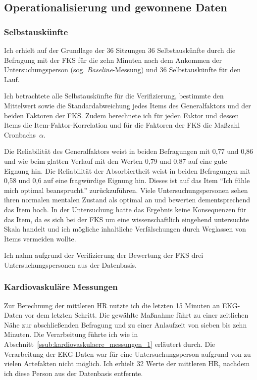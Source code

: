 \subsection{Operationalisierung und gewonnene Daten}

\subsubsection{Selbstauskünfte}
Ich erhielt auf der Grundlage der 36 Sitzungen 36 Selbstauskünfte durch die Befragung mit der \ac{FKS} für die zehn Minuten nach dem Ankommen der Untersuchungsperson (sog. \emph{Baseline}-Messung) und 36 Selbstauskünfte für den Lauf. 

Ich betrachtete alle Selbstauskünfte für die Verifizierung, bestimmte den Mittelwert sowie die Standardabweichung jedes Items des Generalfaktors und der beiden Faktoren der \ac{FKS}. Zudem berechnete ich für jeden Faktor und dessen Items die Item-Faktor-Korrelation und für die Faktoren der \ac{FKS} die Maßzahl Cronbachs~$\alpha$. 

Die Reliabilität des Generalfaktors weist in beiden Befragungen mit 0,77 und 0,86 und wie beim glatten Verlauf mit den Werten 0,79 und 0,87 auf eine gute Eignung hin. Die Reliabilität der Absorbiertheit weist in beiden Befragungen mit 0,58 und 0,6 auf eine fragwürdige Eignung hin. Dieses ist auf das Item "`Ich fühle mich optimal beansprucht."' zurückzuführen. Viele Untersuchungspersonen sehen ihren normalen mentalen Zustand als optimal an und bewerten dementsprechend das Item hoch. In der Untersuchung hatte das Ergebnis keine Konsequenzen für das Item, da es sich bei der \ac{FKS} um eine wissenschaftlich eingehend untersuchte Skala handelt und ich mögliche inhaltliche Verfälschungen durch Weglassen von Items vermeiden wollte. 

Ich nahm aufgrund der Verifizierung der Bewertung der \ac{FKS} drei Untersuchungspersonen aus der Datenbasis. 

\subsubsection{Kardiovaskuläre Messungen}
Zur Berechnung der mittleren \ac{HR} nutzte ich die letzten 15 Minuten an \ac{EKG}-Daten vor dem letzten Schritt. Die gewählte Maßnahme führt zu einer zeitlichen Nähe zur abschließenden Befragung und zu einer Anlaufzeit von sieben bis zehn Minuten. Die Verarbeitung führte ich wie in Abschnitt~\ref{ssub:kardiovaskulaere_messungen_1} erläutert durch. Die Verarbeitung der \ac{EKG}-Daten war für eine Untersuchungsperson aufgrund von zu vielen Artefakten nicht möglich. Ich erhielt 32 Werte der mittleren \ac{HR}, nachdem ich diese Person aus der Datenbasis entfernte.

